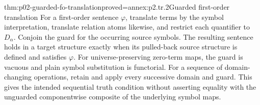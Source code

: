 \begin{hbtheorem}{thm:p02-guarded-fo-translation}{proved=annex:p2.tr.2}{Guarded first-order translation}
For a first-order sentence \(\varphi\), translate terms by the symbol
interpretation, translate relation atoms likewise, and restrict each
quantifier to \(D_\alpha\). Conjoin the guard for the occurring source
symbols. The resulting sentence holds in a target structure exactly
when its pulled-back source structure is defined and satisfies
\(\varphi\). For universe-preserving zero-term maps, the guard is
vacuous and plain symbol substitution is functorial.
For a sequence of domain-changing operations, retain and apply every
successive domain and guard. This gives the intended sequential truth
condition without asserting equality with the unguarded componentwise
composite of the underlying symbol maps.
\end{hbtheorem}
